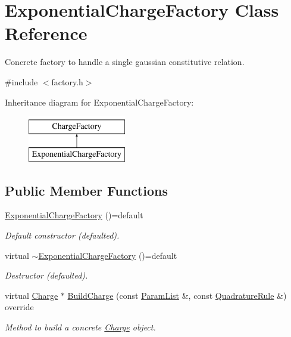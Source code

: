 \hypertarget{classExponentialChargeFactory}{\section{Exponential\-Charge\-Factory Class Reference}
\label{classExponentialChargeFactory}
}


Concrete factory to handle a single gaussian constitutive relation.  




{\ttfamily \#include $<$factory.\-h$>$}

Inheritance diagram for Exponential\-Charge\-Factory\-:\begin{figure}[H]
\begin{center}
\leavevmode
\includegraphics[height=2.000000cm]{classExponentialChargeFactory}
\end{center}
\end{figure}
\subsection*{Public Member Functions}
\begin{DoxyCompactItemize}
\item 
\hypertarget{classExponentialChargeFactory_a857af7212bef3bc0691b90f82160ede0}{\hyperlink{classExponentialChargeFactory_a857af7212bef3bc0691b90f82160ede0}{Exponential\-Charge\-Factory} ()=default}\label{classExponentialChargeFactory_a857af7212bef3bc0691b90f82160ede0}

\begin{DoxyCompactList}\small\item\em Default constructor (defaulted). \end{DoxyCompactList}\item 
\hypertarget{classExponentialChargeFactory_a27be0c4dbe004a49db0065cd9e26bb04}{virtual \hyperlink{classExponentialChargeFactory_a27be0c4dbe004a49db0065cd9e26bb04}{$\sim$\-Exponential\-Charge\-Factory} ()=default}\label{classExponentialChargeFactory_a27be0c4dbe004a49db0065cd9e26bb04}

\begin{DoxyCompactList}\small\item\em Destructor (defaulted). \end{DoxyCompactList}\item 
virtual \hyperlink{classCharge}{Charge} $\ast$ \hyperlink{classExponentialChargeFactory_a1e1718ca16c1624e98865bc6359c2136}{Build\-Charge} (const \hyperlink{classParamList}{Param\-List} \&, const \hyperlink{classQuadratureRule}{Quadrature\-Rule} \&) override
\begin{DoxyCompactList}\small\item\em Method to build a concrete \hyperlink{classCharge}{Charge} object. \end{DoxyCompactList}\end{DoxyCompactItemize}


